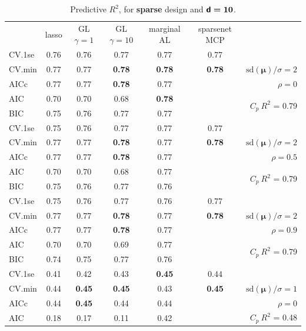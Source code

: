 \documentclass[12pt]{article}
\newcommand{\mr}[1]{\mathrm{#1}}
\newcommand{\bm}[1]{\mathbf{#1}}
\begin{document}

\begin{table}[p]\vspace{-.5cm}
\caption[l]{ Predictive $R^2$, for {\bf sparse} design and  $\boldsymbol{{\sf d}=10}$.}
\vspace{-.5cm}
\small{}
\begin{center}
\begin{tabular}{l*{5}{c}|r}
 & lasso & GL $\gamma=1$ & GL $\gamma=10$ & marginal AL & sparsenet MCP  &  \\
\cline{1-7}
CV.1se & 0.76 & 0.76 & 0.77 & 0.77 & 0.77 &\\
CV.min & 0.77 & 0.77 & {\bf 0.78} & {\bf 0.78} & {\bf 0.78} &  $\mr{sd}(\bm{\mu})/\sigma=2$ \\
AICc & 0.77 & 0.77 & {\bf 0.78} & 0.77 & & $\rho=0$ \\
AIC & 0.70 & 0.70 & 0.68 & {\bf 0.78} & & \multirow{2}{*}{$C_p ~ R^2$ = 0.79} \\
BIC & 0.75 & 0.76 & 0.77 & 0.77 & & \\
 \hline 
CV.1se & 0.75 & 0.76 & 0.77 & 0.77 & 0.77 &\\
CV.min & 0.77 & 0.77 & {\bf 0.78} & 0.77 & {\bf 0.78} &  $\mr{sd}(\bm{\mu})/\sigma=2$ \\
AICc & 0.77 & 0.77 & {\bf 0.78} & 0.77 & & $\rho=0.5$ \\
AIC & 0.70 & 0.70 & 0.68 & 0.77 & & \multirow{2}{*}{$C_p ~ R^2$ = 0.79} \\
BIC & 0.75 & 0.76 & 0.77 & 0.76 & & \\
 \hline 
CV.1se & 0.75 & 0.76 & 0.77 & 0.76 & 0.77 &\\
CV.min & 0.77 & 0.77 & {\bf 0.78} & 0.77 & {\bf 0.78} &  $\mr{sd}(\bm{\mu})/\sigma=2$ \\
AICc & 0.77 & 0.77 & {\bf 0.78} & 0.77 & & $\rho=0.9$ \\
AIC & 0.70 & 0.70 & 0.69 & 0.77 & & \multirow{2}{*}{$C_p ~ R^2$ = 0.79} \\
BIC & 0.74 & 0.75 & 0.77 & 0.76 & & \\
 \hline 
CV.1se & 0.41 & 0.42 & 0.43 & {\bf 0.45} & 0.44 &\\
CV.min & 0.44 & {\bf 0.45} & {\bf 0.45} & 0.43 & {\bf 0.45} &  $\mr{sd}(\bm{\mu})/\sigma=1$ \\
AICc & 0.44 & {\bf 0.45} & 0.44 & 0.44 & & $\rho=0$ \\
AIC & 0.18 & 0.17 & 0.11 & 0.42 & & \multirow{2}{*}{$C_p ~ R^2$ = 0.48} \\

\end{tabular}
\end{center}
\end{table}
\end{document}
